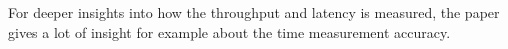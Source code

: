 

For deeper insights into how the throughput and latency is measured,
the paper \cite{emmerich2015moongen} gives a lot of insight for
example about the time measurement accuracy.



